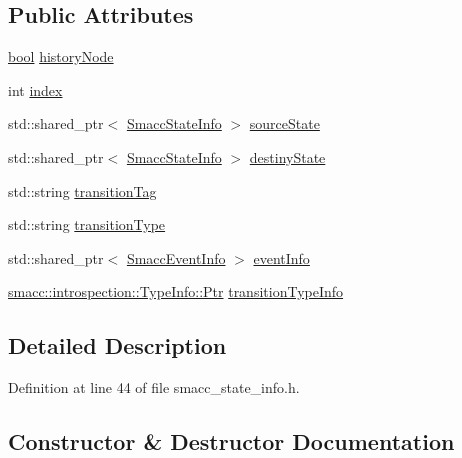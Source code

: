 \subsection*{Public Attributes}
\begin{DoxyCompactItemize}
\item 
\hyperlink{classbool}{bool} \hyperlink{structsmacc_1_1introspection_1_1SmaccTransitionInfo_acbb8f7891dd0c541b26feb82149cb780}{history\+Node}
\item 
int \hyperlink{structsmacc_1_1introspection_1_1SmaccTransitionInfo_a4b9e9f140aefd8ecd6697bcaa4b681af}{index}
\item 
std\+::shared\+\_\+ptr$<$ \hyperlink{classsmacc_1_1introspection_1_1SmaccStateInfo}{Smacc\+State\+Info} $>$ \hyperlink{structsmacc_1_1introspection_1_1SmaccTransitionInfo_aa44f16d098eb91ed222008fe0abf1275}{source\+State}
\item 
std\+::shared\+\_\+ptr$<$ \hyperlink{classsmacc_1_1introspection_1_1SmaccStateInfo}{Smacc\+State\+Info} $>$ \hyperlink{structsmacc_1_1introspection_1_1SmaccTransitionInfo_a041f159a4cd56cfbc005765d093d0d4a}{destiny\+State}
\item 
std\+::string \hyperlink{structsmacc_1_1introspection_1_1SmaccTransitionInfo_aece8c6af9a682232a435ca1d92b953bd}{transition\+Tag}
\item 
std\+::string \hyperlink{structsmacc_1_1introspection_1_1SmaccTransitionInfo_a8f4682c18a3b6c09f6b942a4fa7b524d}{transition\+Type}
\item 
std\+::shared\+\_\+ptr$<$ \hyperlink{structsmacc_1_1introspection_1_1SmaccEventInfo}{Smacc\+Event\+Info} $>$ \hyperlink{structsmacc_1_1introspection_1_1SmaccTransitionInfo_a573be95bb6fdeeae46fc5ed56b260138}{event\+Info}
\item 
\hyperlink{classsmacc_1_1introspection_1_1TypeInfo_aa6ffd9c39811d59f7c771941b7fad860}{smacc\+::introspection\+::\+Type\+Info\+::\+Ptr} \hyperlink{structsmacc_1_1introspection_1_1SmaccTransitionInfo_a98364c74dec9e1cf1337743ce0771a33}{transition\+Type\+Info}
\end{DoxyCompactItemize}


\subsection{Detailed Description}


Definition at line 44 of file smacc\+\_\+state\+\_\+info.\+h.



\subsection{Constructor \& Destructor Documentation}
